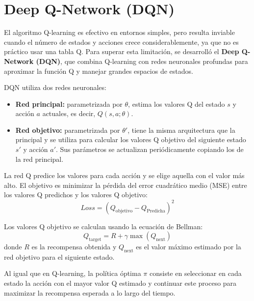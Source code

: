 \newpage

\section{Deep Q-Network (DQN)}

El algoritmo Q-learning es efectivo en entornos simples, pero resulta inviable cuando el número de estados y acciones crece considerablemente, ya que no es práctico usar una tabla Q. Para superar esta limitación, se desarrolló el \textbf{Deep Q-Network (DQN)}, que combina Q-learning con redes neuronales profundas para aproximar la función Q y manejar grandes espacios de estados.

DQN utiliza dos redes neuronales:
\begin{itemize}
    \item \textbf{Red principal:} parametrizada por $\theta$, estima los valores Q del estado $s$ y acción $a$ actuales, es decir, $Q(s, a; \theta)$.
    \item \textbf{Red objetivo:} parametrizada por $\theta'$, tiene la misma arquitectura que la principal y se utiliza para calcular los valores Q objetivo del siguiente estado $s'$ y acción $a'$. Sus parámetros se actualizan periódicamente copiando los de la red principal.
\end{itemize}

La red Q predice los valores para cada acción y se elige aquella con el valor más alto. El objetivo es minimizar la pérdida del error cuadrático medio (MSE) entre los valores Q predichos y los valores Q objetivo:
\[
Loss = \left(Q_{\text{objetivo}} - Q_{\text{Predicha}}\right)^2
\]

Los valores Q objetivo se calculan usando la ecuación de Bellman:
\[
Q_{\text{target}} = R + \gamma \max(Q_{\text{next}})
\]
donde $R$ es la recompensa obtenida y $Q_{\text{next}}$ es el valor máximo estimado por la red objetivo para el siguiente estado.

Al igual que en Q-learning, la política óptima $\pi$ consiste en seleccionar en cada estado la acción con el mayor valor Q estimado y continuar este proceso para maximizar la recompensa esperada a lo largo del tiempo.

\begin{center}
\end{center}





